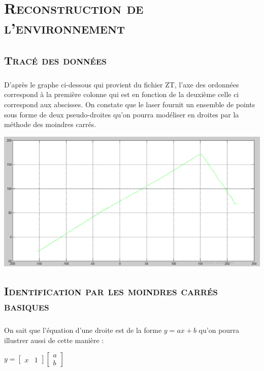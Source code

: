 \chapter{\textsc{Reconstruction de l'environnement}}

\section{\textsc{Tracé des données}}

	\paragraph{}
	D'après le graphe ci-dessous qui provient du fichier ZT, l'axe des ordonnées correspond à la première colonne 			qui est en fonction de la deuxième celle ci correspond aux abscisses. On constate que le laser fournit un 				ensemble de points sous forme de deux pseudo-droites qu'on pourra modéliser en droites par la méthode des 				moindres carrés.\\  
	
	\begin{center}
	\includegraphics[scale=0.5]{graphedonnees.png}
	\label{fig2} 
	\end{center} 

\pagebreak
\section{\textsc{Identification par les moindres carrés basiques}}	

	\paragraph{}
	On sait que l'équation d'une droite est de la forme $ y=ax+b $ qu'on pourra illustrer aussi de cette manière :\\
	\begin{center}
		$ y = \begin{bmatrix} x&1 \end{bmatrix} \begin{bmatrix} a\\b \end{bmatrix} $ 
	\end{center}
	
